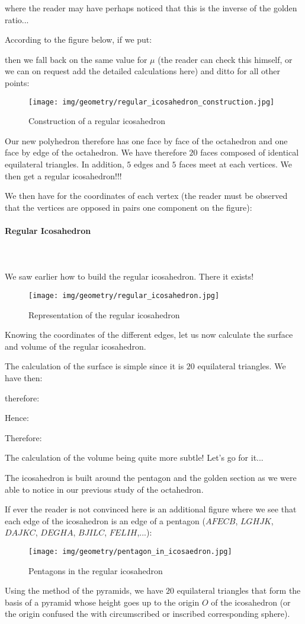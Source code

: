{	where the reader may have perhaps noticed that this is the inverse of the golden ratio...
	
	According to the figure below, if we put:
	
	then we fall back on the same value for $\mu$ (the reader can check this himself, or we can on request add the detailed calculations here) and ditto for all other points:
	\begin{figure}[H]
		\centering
		\texttt{[image: img/geometry/regular\_icosahedron\_construction.jpg]}
		\caption{Construction of a regular icosahedron}
	\end{figure}
	Our new polyhedron therefore has one face by face of the octahedron and one face by edge of the octahedron. We have therefore $20$ faces composed of identical equilateral triangles. In addition, $5$ edges and $5$ faces meet at each vertices. We then get a regular icosahedron!!!
	
	We then have for the coordinates of each vertex (the reader must be observed that the vertices are opposed in pairs one component on the figure):
	
	
	\paragraph{Regular Icosahedron}\mbox{}\\\\
	We saw earlier how to build the regular icosahedron. There it exists!
	\begin{figure}[H]
		\centering
		\texttt{[image: img/geometry/regular\_icosahedron.jpg]}
		\caption{Representation of the regular icosahedron}
	\end{figure}
	Knowing the coordinates of the different edges, let us now calculate the surface and volume of the regular icosahedron.
	
	The calculation of the surface is simple since it is $20$ equilateral triangles. We have then:
	
	therefore:
	
	Hence:
	
	Therefore:
	
	The calculation of the volume being quite more subtle! Let's go for it...
	
	The icosahedron is built around the pentagon and the golden section as we were able to notice in our previous study of the octahedron.
	
	If ever the reader is not convinced here is an additional figure where we see that each edge of the icosahedron is an edge of a pentagon ($AFECB$, $LGHJK$, $DAJKC$, $DEGHA$, $BJILC$, $FELIH$,...):
	\begin{figure}[H]
		\centering
		\texttt{[image: img/geometry/pentagon\_in\_icosaedron.jpg]}
		\caption{Pentagons in the regular icosahedron}
	\end{figure}
	Using the method of the pyramids, we have $20$ equilateral triangles that form the basis of a pyramid whose height goes up to the origin $O$ of the icosahedron (or the origin confused the with circumscribed or inscribed corresponding sphere).
	
}
